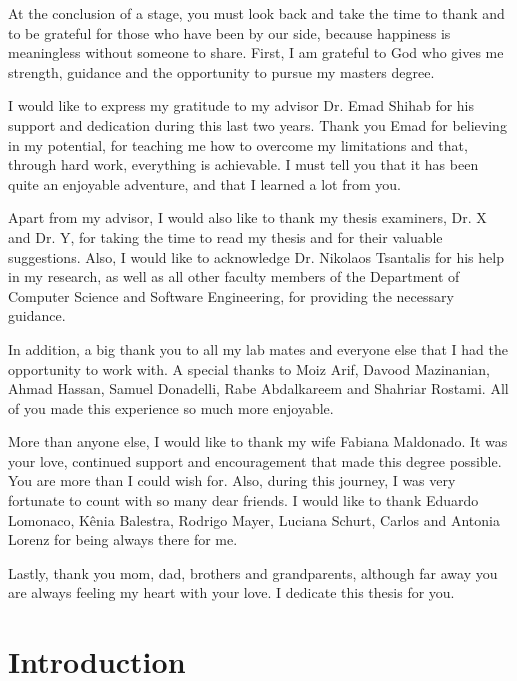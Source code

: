 \documentclass[12pt]{report}
\begin{document}
\begin{acknowledgments}
At the conclusion of a stage, you must look back and take the time to thank and to be grateful for those who have been by our side, because happiness is meaningless without someone to share. First, I am grateful to God who gives me strength, guidance and the opportunity to pursue my masters degree. 

I would like to express my gratitude to my advisor Dr. Emad Shihab for his support and dedication during this last two years. Thank you Emad for believing in my potential, for teaching me how to overcome my limitations and that, through hard work, everything is achievable. I must tell you that it has been quite an enjoyable adventure, and that I learned a lot from you. 

Apart from my advisor, I would also like to thank my thesis examiners, Dr. X and Dr. Y, for taking the time to read my thesis and for their valuable suggestions. Also, I would like to acknowledge Dr. Nikolaos Tsantalis for his help in my research, as well as all other faculty members of the Department of Computer Science and Software Engineering, for providing the necessary guidance.

In addition, a big thank you to all my lab mates and everyone else that I had the opportunity to work with. A special thanks to Moiz Arif, Davood Mazinanian, Ahmad Hassan, Samuel Donadelli, Rabe Abdalkareem and Shahriar Rostami. All of you made this experience so much more enjoyable. 

More than anyone else, I would like to thank my wife Fabiana Maldonado. It was your love, continued support and encouragement that made this degree possible. You are more than I could wish for. Also, during this journey, I was very fortunate to count with so many dear friends. I would like to thank Eduardo Lomonaco, K\^{e}nia Balestra, Rodrigo Mayer, Luciana Schurt, Carlos and Antonia Lorenz for being always there for me. 

Lastly, thank you mom, dad, brothers and grandparents, although far away you are always feeling my heart with your love. I dedicate this thesis for you.

\end{acknowledgments}

\chapter{Introduction}
\label{introduction}

\end{document}
